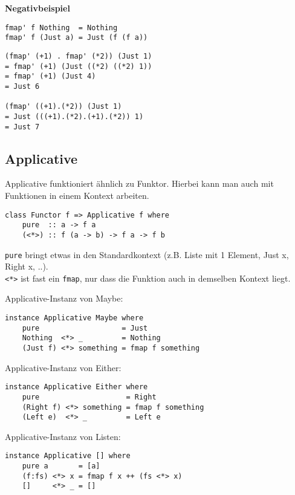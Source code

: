 \documentclass{beamer}
\begin{document}
\begin{frame}[fragile]
\begin{important}\begin{center}\textbf{Negativbeispiel}\end{center}\end{important}
\begin{verbatim}
fmap' f Nothing  = Nothing
fmap' f (Just a) = Just (f (f a))
\end{verbatim}
\pause
\begin{verbatim}
(fmap' (+1) . fmap' (*2)) (Just 1)
= fmap' (+1) (Just ((*2) ((*2) 1))
= fmap' (+1) (Just 4)
= Just 6

(fmap' ((+1).(*2)) (Just 1) 
= Just (((+1).(*2).(+1).(*2)) 1)
= Just 7
\end{verbatim}

\end{frame}


\subsection{Applicative}
\begin{frame}[fragile]
Applicative funktioniert ähnlich zu Funktor. Hierbei kann man auch mit Funktionen in einem Kontext arbeiten.\\
\pause
\begin{verbatim}
class Functor f => Applicative f where
    pure  :: a -> f a
    (<*>) :: f (a -> b) -> f a -> f b
\end{verbatim}
\pause
\texttt{pure} bringt etwas in den Standardkontext (z.B. Liste mit 1 Element, Just x, Right x, ..).\\
\texttt{<*>} ist fast ein \texttt{fmap}, nur dass die Funktion auch in demselben Kontext liegt.
\end{frame}

\begin{frame}[fragile]
Applicative-Instanz von Maybe:
\begin{verbatim}
instance Applicative Maybe where
    pure                   = Just
    Nothing  <*> _         = Nothing
    (Just f) <*> something = fmap f something
\end{verbatim}
\pause
Applicative-Instanz von Either:
\begin{verbatim}
instance Applicative Either where
    pure                    = Right
    (Right f) <*> something = fmap f something
    (Left e)  <*> _         = Left e
\end{verbatim}
\pause
Applicative-Instanz von Listen:
\begin{verbatim}
instance Applicative [] where
    pure a       = [a]
    (f:fs) <*> x = fmap f x ++ (fs <*> x)
    []     <*> _ = []
\end{verbatim}
\end{frame}
\end{document}
